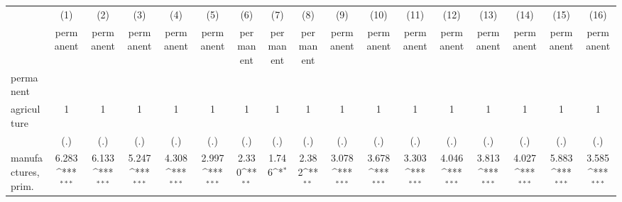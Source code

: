 {
\def\sym#1{\ifmmode^{#1}\else\(^{#1}\)\fi}
\begin{tabular}{l*{16}{c}}
\hline\hline
                    &\multicolumn{1}{c}{(1)}&\multicolumn{1}{c}{(2)}&\multicolumn{1}{c}{(3)}&\multicolumn{1}{c}{(4)}&\multicolumn{1}{c}{(5)}&\multicolumn{1}{c}{(6)}&\multicolumn{1}{c}{(7)}&\multicolumn{1}{c}{(8)}&\multicolumn{1}{c}{(9)}&\multicolumn{1}{c}{(10)}&\multicolumn{1}{c}{(11)}&\multicolumn{1}{c}{(12)}&\multicolumn{1}{c}{(13)}&\multicolumn{1}{c}{(14)}&\multicolumn{1}{c}{(15)}&\multicolumn{1}{c}{(16)}\\
                    &\multicolumn{1}{c}{permanent}&\multicolumn{1}{c}{permanent}&\multicolumn{1}{c}{permanent}&\multicolumn{1}{c}{permanent}&\multicolumn{1}{c}{permanent}&\multicolumn{1}{c}{permanent}&\multicolumn{1}{c}{permanent}&\multicolumn{1}{c}{permanent}&\multicolumn{1}{c}{permanent}&\multicolumn{1}{c}{permanent}&\multicolumn{1}{c}{permanent}&\multicolumn{1}{c}{permanent}&\multicolumn{1}{c}{permanent}&\multicolumn{1}{c}{permanent}&\multicolumn{1}{c}{permanent}&\multicolumn{1}{c}{permanent}\\
\hline
permanent           &                     &                     &                     &                     &                     &                     &                     &                     &                     &                     &                     &                     &                     &                     &                     &                     \\
agriculture         &           1         &           1         &           1         &           1         &           1         &           1         &           1         &           1         &           1         &           1         &           1         &           1         &           1         &           1         &           1         &           1         \\
                    &         (.)         &         (.)         &         (.)         &         (.)         &         (.)         &         (.)         &         (.)         &         (.)         &         (.)         &         (.)         &         (.)         &         (.)         &         (.)         &         (.)         &         (.)         &         (.)         \\
[1em]
manufactures, prim. &       6.283\sym{***}&       6.133\sym{***}&       5.247\sym{***}&       4.308\sym{***}&       2.997\sym{***}&       2.330\sym{**} &       1.746\sym{*}  &       2.382\sym{**} &       3.078\sym{***}&       3.678\sym{***}&       3.303\sym{***}&       4.046\sym{***}&       3.813\sym{***}&       4.027\sym{***}&       5.883\sym{***}&       3.585\sym{***}\\

\end{tabular}}
